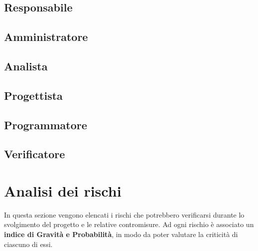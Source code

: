 \documentclass{article}
\begin{document}
\subsection{Responsabile}

\subsection{Amministratore}

\subsection{Analista}

\subsection{Progettista}

\subsection{Programmatore}

\subsection{Verificatore}

\newpage
\section{Analisi dei rischi}
In questa sezione vengono elencati i rischi che potrebbero verificarsi durante lo svolgimento del progetto e le relative contromisure. Ad ogni rischio è associato un \textbf{indice di Gravità e Probabilità},
in modo da poter valutare la criticità di ciascuno di essi.
\end{document}
